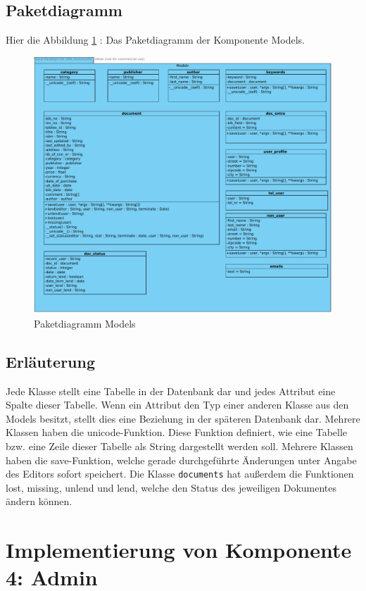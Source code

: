 \subsection{Paketdiagramm}
Hier die Abbildung \ref{fig:PDmodels} : Das Paketdiagramm der Komponente Models.
\begin{figure}[H]
\includegraphics[width=0.9\linewidth]{bilder/Paketdiagramm_models.pdf}
\caption{Paketdiagramm Models}
\label{fig:PDmodels}
\end{figure}
\subsection{Erl\"auterung}
Jede Klasse stellt eine Tabelle in der Datenbank dar und jedes Attribut eine
Spalte dieser Tabelle. Wenn ein Attribut den Typ einer anderen Klasse aus den
Models besitzt, stellt dies eine Beziehung in der späteren Datenbank dar.
Mehrere Klassen haben die unicode-Funktion. Diese Funktion definiert, wie eine
Tabelle bzw. eine Zeile dieser Tabelle als String dargestellt werden soll.
Mehrere Klassen haben die save-Funktion, welche gerade durchgeführte Änderungen
unter Angabe des Editors sofort speichert. Die Klasse \lstinline{documents} hat außerdem
die Funktionen lost, missing, unlend und lend, welche den Status des jeweiligen
Dokumentes ändern können.

\section{Implementierung von Komponente
         4: Admin}

